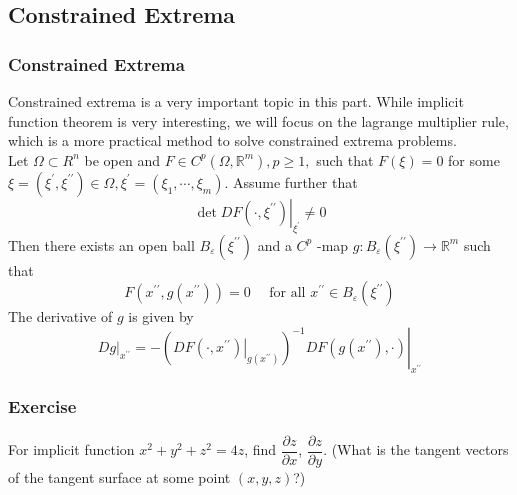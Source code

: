 \documentclass[11pt, t]{beamer}
\newcommand{\nullspace}{~\\[15pt]}
\begin{document}
\subsection{Constrained Extrema}
\begin{frame}
    \frametitle{Constrained Extrema}
    Constrained extrema is a very important topic in this part. While implicit function theorem is very interesting, we will focus on the lagrange multiplier rule, which is a more practical method to solve constrained extrema problems.
    \nullspace
    Let $\Omega \subset R^{n}$ be open and $F \in C^{p}\left(\Omega, \mathbb{R}^{m}\right), p \geq 1,$ such that $F(\xi)=0$ for some $\xi=\left(\xi^{\prime}, \xi^{\prime \prime}\right) \in \Omega, \xi^{\prime}=\left(\xi_{1}, \cdots, \xi_{m}\right) .$ Assume further that
    \[
        \left.\operatorname{det} D F\left(\cdot, \xi^{\prime \prime}\right)\right|_{\xi^{\prime}} \neq 0
    \]
    Then there exists an open ball $B_{\varepsilon}\left(\xi^{\prime \prime}\right)$ and a $C^{p}$ -map $g: B_{\varepsilon}\left(\xi^{\prime \prime}\right) \rightarrow \mathbb{R}^{m}$
    such that
    \[
        F\left(x^{\prime \prime}, g\left(x^{\prime \prime}\right)\right)=0 \quad \text { for all } x^{\prime \prime} \in B_{\varepsilon}\left(\xi^{\prime \prime}\right)
    \]
    The derivative of $g$ is given by
    \[
        \left.D g\right|_{x^{\prime \prime}}=-\left.\left(\left.D F\left(\cdot, x^{\prime \prime}\right)\right|_{g\left(x^{\prime \prime}\right)}\right)^{-1} D F\left(g\left(x^{\prime \prime}\right), \cdot\right)\right|_{x^{\prime \prime}}
    \]
\end{frame}

\begin{frame}
    \frametitle{Exercise}

    For implicit function $x^2+y^2+z^2=4z$, find $\dfrac{\partial z}{\partial x}$, $\dfrac{\partial z}{\partial y}$. (What is the tangent vectors of the tangent surface at some point $(x,y,z)$?)

\end{frame}
\end{document}

